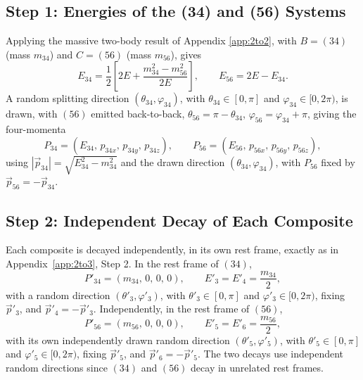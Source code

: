 \documentclass{article}
\begin{document}
\subsection{Step 1: Energies of the (34) and (56) Systems}
Applying the massive two-body result of Appendix \ref{app:2to2}, with $B = (34)$ (mass $m_{34}$) and $C = (56)$ (mass $m_{56}$), gives
\begin{equation}
    E_{34} = \frac{1}{2}\left[2E + \frac{m_{34}^2 - m_{56}^2}{2E}\right], \qquad E_{56} = 2E - E_{34}.
\end{equation}
A random splitting direction $(\theta_{34}, \varphi_{34})$, with $\theta_{34} \in [0,\pi]$ and $\varphi_{34} \in [0, 2\pi)$, is drawn, with $(56)$ emitted back-to-back, $\theta_{56} = \pi - \theta_{34}$, $\varphi_{56} = \varphi_{34} + \pi$, giving the four-momenta
\begin{equation}
    P_{34} = (E_{34},\, p_{34x},\, p_{34y},\, p_{34z}), \qquad P_{56} = (E_{56},\, p_{56x},\, p_{56y},\, p_{56z}),
\end{equation}
using $|\vec{p}_{34}| = \sqrt{E_{34}^2 - m_{34}^2}$ and the drawn direction $(\theta_{34}, \varphi_{34})$, with $P_{56}$ fixed by $\vec{p}_{56} = -\vec{p}_{34}$.

\subsection{Step 2: Independent Decay of Each Composite}
Each composite is decayed independently, in its own rest frame, exactly as in Appendix~\ref{app:2to3}, Step 2. In the rest frame of $(34)$,
\begin{equation}
    P'_{34} = (m_{34},\, 0,\, 0,\, 0), \qquad E'_3 = E'_4 = \frac{m_{34}}{2},
\end{equation}
with a random direction $(\theta'_3, \varphi'_3)$, with $\theta'_3 \in [0,\pi]$ and $\varphi'_3 \in [0, 2\pi)$, fixing $\vec{p}'_3$, and $\vec{p}'_4 = -\vec{p}'_3$. Independently, in the rest frame of $(56)$,
\begin{equation}
    P'_{56} = (m_{56},\, 0,\, 0,\, 0), \qquad E'_5 = E'_6 = \frac{m_{56}}{2},
\end{equation}
with its own independently drawn random direction $(\theta'_5, \varphi'_5)$, with $\theta'_5 \in [0,\pi]$ and $\varphi'_5 \in [0, 2\pi)$, fixing $\vec{p}'_5$, and $\vec{p}'_6 = -\vec{p}'_5$. The two decays use independent random directions since $(34)$ and $(56)$ decay in unrelated rest frames.
\end{document}
